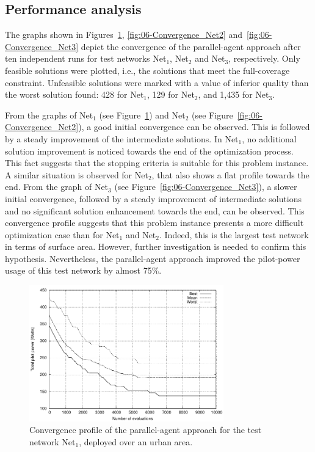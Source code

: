 \subsection{Performance analysis}

The graphs shown in Figures~\ref{fig:06-Convergence_Net1}, \ref{fig:06-Convergence_Net2}
and~\ref{fig:06-Convergence_Net3} depict the convergence of the
parallel-agent approach after ten independent runs for test networks
Net$_{1}$, Net$_{2}$ and Net$_{3}$, respectively. Only feasible
solutions were plotted, i.e., the solutions that meet the full-coverage
constraint. Unfeasible solutions were marked with a value of inferior
quality than the worst solution found: 428 for Net$_{1}$, 129 for
Net$_{2}$, and 1,435 for Net$_{3}$.

From the graphs of Net$_{1}$ (see Figure~\ref{fig:06-Convergence_Net1})
and Net$_{2}$ (see Figure~\ref{fig:06-Convergence_Net2}), a good
initial convergence can be observed. This is followed by a steady
improvement of the intermediate solutions. In Net$_{1}$, no additional
solution improvement is noticed towards the end of the optimization
process. This fact suggests that the stopping criteria is suitable
for this problem instance. A similar situation is observed for Net$_{2}$,
that also shows a flat profile towards the end. From the graph of
Net$_{3}$ (see Figure~\ref{fig:06-Convergence_Net3}), a slower
initial convergence, followed by a steady improvement of intermediate
solutions and no significant solution enhancement towards the end,
can be observed. This convergence profile suggests that this problem
instance presents a more difficult optimization case than for Net$_{1}$
and Net$_{2}$. Indeed, this is the largest test network in terms
of surface area. However, further investigation is needed to confirm
this hypothesis. Nevertheless, the parallel-agent approach improved
the pilot-power usage of this test network by almost 75\%.

\begin{figure}
\centering

\includegraphics[width=0.75\textwidth]{06-experimental_evaluation-service_coverage/img/convergence_first}

\caption{Convergence profile of the parallel-agent approach for the test network
Net$_{1}$, deployed over an urban area.\emph{\label{fig:06-Convergence_Net1}}}
\end{figure}


